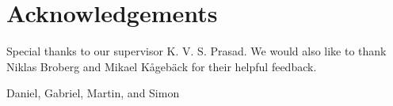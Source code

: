 \thispagestyle{plain}			%
\section*{Acknowledgements}

Special thanks to our supervisor K. V. S. Prasad. We would also like to thank Niklas Broberg and Mikael Kågebäck for their helpful feedback. 

\vspace{1.5cm}
\hfill
Daniel, Gabriel, Martin, and Simon

\newpage				%
\thispagestyle{empty}
\mbox{}